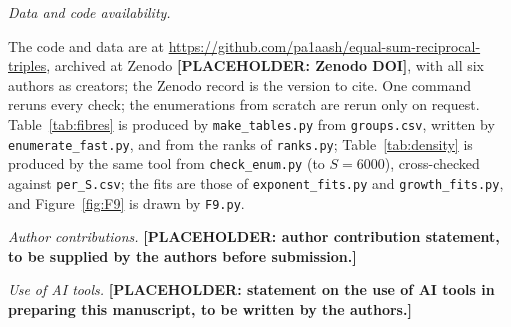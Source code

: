 \documentclass[10pt]{article}
\begin{document}
\noindent\textit{Data and code availability.} {\sloppy The code and data are at \url{https://github.com/pa1aash/equal-sum-reciprocal-triples}, archived at Zenodo \textbf{[PLACEHOLDER: Zenodo DOI]}, with all six authors as creators; the Zenodo record is the version to cite. One command reruns every check; the enumerations from scratch are rerun only on request. Table~\ref{tab:fibres} is produced by \texttt{make\_tables.py} from \texttt{groups.csv}, written by \texttt{enumerate\_fast.py}, and from the ranks of \texttt{ranks.py}; Table~\ref{tab:density} is produced by the same tool from \texttt{check\_enum.py} (to $S=6000$), cross-checked against \texttt{per\_S.csv}; the fits are those of \texttt{exponent\_fits.py} and \texttt{growth\_fits.py}, and Figure~\ref{fig:F9} is drawn by \texttt{F9.py}.\par}

\noindent\textit{Author contributions.} \textbf{[PLACEHOLDER: author contribution statement, to be supplied by the authors before submission.]}

\noindent\textit{Use of AI tools.} \textbf{[PLACEHOLDER: statement on the use of AI tools in preparing this manuscript, to be written by the authors.]}

\end{document}
